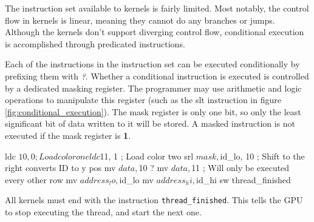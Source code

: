 \documentclass[../main/report.tex]{subfiles}
\begin{document}
The instruction set available to kernels is fairly limited.
Most notably, the control flow in kernels is linear, meaning they cannot do any branches or jumps.
Although the kernels don't support diverging control flow,
conditional execution is accomplished through predicated instructions.

Each of the instructions in the instruction set can be executed conditionally by prefixing them with \emph{?}.
Whether a conditional instruction is executed is controlled by a dedicated masking register.
The programmer may use arithmetic and logic operations to manipulate this register (such as the slt instruction in figure \ref{fig:conditional_execution}).
The mask register is only one bit, so only the least significant bit of data written to it will be stored.
A masked instruction is not executed if the mask register is \textbf{1}.

\begin{assembly}
ldc $10, 0 ; Load color one
ldc $11, 1 ; Load color two
srl $mask, $id_lo, 10 ; Shift to the right converts ID to y pos
mv $data, $10 
? mv $data, $11 ; Will only be executed every other row
mv $address_lo, $id_lo
mv $address_hi, $id_hi
sw
thread_finished
\end{assembly}

All kernels must end with the instruction \verb/thread_finished/.
This tells the GPU to stop executing the thread, and start the next one.

\end{document}
